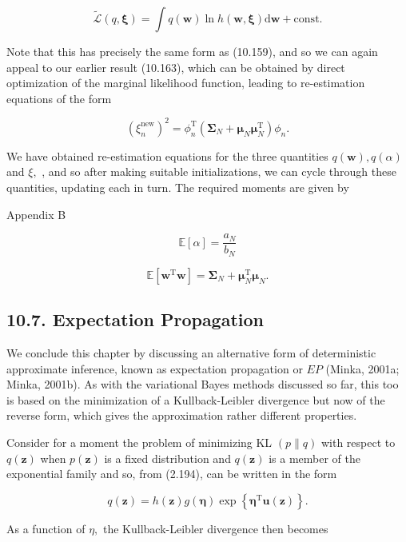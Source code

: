 \documentclass[
  10
]{article}
\begin{document}
\[
\widetilde {\mathcal {L}} (q, \pmb {\xi}) = \int q (\mathbf {w}) \ln h (\mathbf {w}, \pmb {\xi}) \mathrm{d} \mathbf {w} + \mathrm{const}.\tag{10.180}
\]

Note that this has precisely the same form as (10.159), and so we can
again appeal to our earlier result (10.163), which can be obtained by
direct optimization of the marginal likelihood function, leading to
re-estimation equations of the form

\[
(\xi_ {n} ^ {\mathrm{new}}) ^ {2} = \phi_ {n} ^ {\mathrm{T}} (\pmb {\Sigma} _ {N} + \pmb {\mu} _ {N} \pmb {\mu} _ {N} ^ {\mathrm{T}}) \phi_ {n}.\tag{10.181}
\]

We have obtained re-estimation equations for the three quantities
\(q ( \mathbf { w } ) , q ( \alpha )\) and \(\xi ,\) , and so after
making suitable initializations, we can cycle through these quantities,
updating each in turn. The required moments are given by

Appendix B

\[
\mathbb {E} [ \alpha ] = \frac {a _ {N}}{b _ {N}}\tag{10.182}
\]

\[
{\mathbb {E} \left[ \mathbf {w} ^ {\mathrm{T}} \mathbf {w} \right]} = {\boldsymbol {\Sigma} _ {N} + \boldsymbol {\mu} _ {N} ^ {\mathrm{T}} \boldsymbol {\mu} _ {N}.}\tag{10.183}
\]

\subsection{10.7. Expectation
Propagation}\label{expectation-propagation}

We conclude this chapter by discussing an alternative form of
deterministic approximate inference, known as expectation propagation or
\(E P\) (Minka, 2001a; Minka, 2001b). As with the variational Bayes
methods discussed so far, this too is based on the minimization of a
Kullback-Leibler divergence but now of the reverse form, which gives the
approximation rather different properties.

Consider for a moment the problem of minimizing KL \(( p \| q )\) with
respect to \(q ( \mathbf { z } )\) when \(p ( \mathbf { z } )\) is a
fixed distribution and \(q ( \mathbf { z } )\) is a member of the
exponential family and so, from (2.194), can be written in the form

\[
q (\mathbf {z}) = h (\mathbf {z}) g (\boldsymbol {\eta}) \exp \left\{\boldsymbol {\eta} ^ {\mathrm{T}} \mathbf {u} (\mathbf {z}) \right\}.\tag{10.184}
\]

As a function of \(\eta ,\) the Kullback-Leibler divergence then becomes
\end{document}
